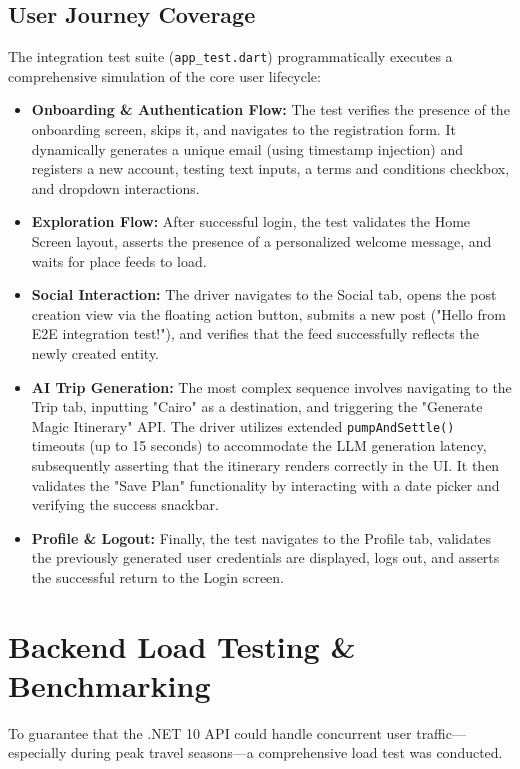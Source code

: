 \subsection{User Journey Coverage}
The integration test suite (\texttt{app\_test.dart}) programmatically executes a comprehensive simulation of the core user lifecycle:
\begin{itemize}
    \item \textbf{Onboarding \& Authentication Flow:} The test verifies the presence of the onboarding screen, skips it, and navigates to the registration form. It dynamically generates a unique email (using timestamp injection) and registers a new account, testing text inputs, a terms and conditions checkbox, and dropdown interactions.
    \item \textbf{Exploration Flow:} After successful login, the test validates the Home Screen layout, asserts the presence of a personalized welcome message, and waits for place feeds to load.
    \item \textbf{Social Interaction:} The driver navigates to the Social tab, opens the post creation view via the floating action button, submits a new post ("Hello from E2E integration test!"), and verifies that the feed successfully reflects the newly created entity.
    \item \textbf{AI Trip Generation:} The most complex sequence involves navigating to the Trip tab, inputting "Cairo" as a destination, and triggering the "Generate Magic Itinerary" API. The driver utilizes extended \texttt{pumpAndSettle()} timeouts (up to 15 seconds) to accommodate the LLM generation latency, subsequently asserting that the itinerary renders correctly in the UI. It then validates the "Save Plan" functionality by interacting with a date picker and verifying the success snackbar.
    \item \textbf{Profile \& Logout:} Finally, the test navigates to the Profile tab, validates the previously generated user credentials are displayed, logs out, and asserts the successful return to the Login screen.
\end{itemize}

\section{Backend Load Testing \& Benchmarking}
To guarantee that the .NET 10 API could handle concurrent user traffic—especially during peak travel seasons—a comprehensive load test was conducted.

